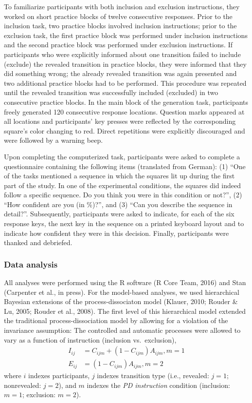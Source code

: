 \documentclass[floatsintext,man]{apa6}
\begin{document}
To familiarize participants with both inclusion and exclusion
instructions, they worked on short practice blocks of twelve consecutive
responses. Prior to the inclusion task, two practice blocks involved
inclusion instructions; prior to the exclusion task, the first practice
block was performed under inclusion instructions and the second practice
block was performed under exclusion instructions. If participants who
were explicitly informed about one transition failed to include
(exclude) the revealed transition in practice blocks, they were informed
that they did something wrong; the already revealed transition was again
presented and two additional practice blocks had to be performed. This
procedure was repeated until the revealed transition was successfully
included (excluded) in two consecutive practice blocks. In the main
block of the generation task, participants freely generated 120
consecutive response locations. Question marks appeared at all locations
and participants' key presses were reflected by the corresponding
square's color changing to red. Direct repetitions were explicitly
discouraged and were followed by a warning beep.

Upon completing the computerized task, participants were asked to
complete a questionnaire containing the following items (translated from
German): (1) \enquote{One of the tasks mentioned a sequence in which the
squares lit up during the first part of the study. In one of the
experimental conditions, the squares did indeed follow a specific
sequence. Do you think you were in this condition or not?}, (2)
\enquote{How confident are you (in \%)?}, and (3) \enquote{Can you
describe the sequence in detail?}. Subsequently, participants were asked
to indicate, for each of the six response keys, the next key in the
sequence on a printed keyboard layout and to indicate how confident they
were in this decision. Finally, participants were thanked and debriefed.

\subsubsection{Data analysis}\label{data-analysis}

All analyses were performed using the R software (R Core Team, 2016) and
Stan (Carpenter et al., in press). For the model-based analyses, we used
hierarchical Bayesian extensions of the process-dissociaton model
(Klauer, 2010; Rouder \& Lu, 2005; Rouder et al., 2008). The first level
of this hierarchical model extended the traditional process-dissociation
model by allowing for a violation of the invariance assumption: The
controlled and automatic processes were allowed to vary as a function of
instruction (inclusion vs.~exclusion), \[
\begin{aligned}
  I_{ij} & =  C_{ijm} + (1-C_{ijm}) A_{ijm}, m = 1\\
  E_{ij} & =  (1-C_{ijm}) A_{ijm}, m = 2
\end{aligned}
\] where \(i\) indexes participants, \(j\) indexes transition type
(i.e., revealed: \(j = 1\); nonrevealed: \(j = 2\)), and \(m\) indexes
the \emph{PD instruction} condition (inclusion: \(m=1\); exclusion:
\(m=2\)).
\end{document}
